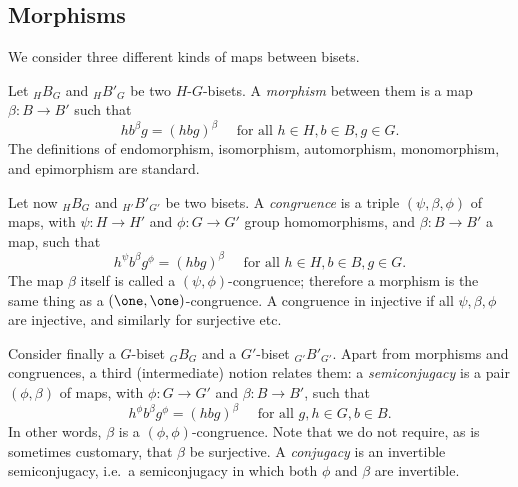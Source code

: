 \documentclass{amsart}
\begin{document}
\subsection{Morphisms}
\label{ss:BisMorph}
We consider three different kinds of maps between bisets.
\begin{defn}
  Let ${}_H B_G$ and ${}_H{B'}_G$ be two $H$-$G$-bisets. A
  \emph{morphism} between them is a map $\beta\colon B\to B'$ such that
  \[h b^\beta g=(h b g)^\beta\quad\text{ for all }h\in H,b\in B,g\in G.
  \]
  The definitions of endomorphism, isomorphism, automorphism,
  monomorphism, and epimorphism are standard.

  Let now ${}_H B_G$ and ${}_{H'}{B'}_{G'}$ be two bisets. A
  \emph{congruence} is a triple $(\psi,\beta,\phi)$ of maps, with
  $\psi\colon H\to H'$ and $\phi\colon G\to G'$ group homomorphisms, and
  $\beta\colon B\to B'$ a map, such that
  \[h^\psi b^\beta g^\phi=(h b g)^\beta\quad\text{ for all }h\in H,b\in B,g\in G.
  \]
  The map $\beta$ itself is called a $(\psi,\phi)$-congruence; therefore a
  morphism is the same thing as a $(\one,\one)$-congruence. A congruence in
  injective if all $\psi,\beta,\phi$ are injective, and similarly for
  surjective etc.

  Consider finally a $G$-biset ${}_GB_G$ and a $G'$-biset
  ${}_{G'}{B'}_{G'}$. Apart from morphisms and congruences, a third
  (intermediate) notion relates them: a \emph{semiconjugacy} is a pair
  $(\phi,\beta)$ of maps, with $\phi\colon G\to G'$ and $\beta\colon B\to B'$,
  such that
  \[h^\phi b^\beta g^\phi=(h b g)^\beta\quad\text{ for all }g,h\in G,b\in B.
  \]
  In other words, $\beta$ is a $(\phi,\phi)$-congruence.  Note that we
  do not require, as is sometimes customary, that $\beta$ be
  surjective. A \emph{conjugacy} is an invertible semiconjugacy, i.e.\
  a semiconjugacy in which both $\phi$ and $\beta$ are invertible.
\end{defn}
\end{document}
